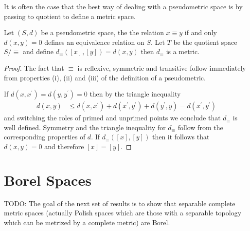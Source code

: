 It is often the case that the best way of dealing with a pseudometric space is by passing to quotient to define a metric space.
\begin{prop}\label{QuotientOfPseudometricSpace}Let $(S,d)$ be a pseudometric space, the the relation $x \equiv y$ if and only $d(x,y) = 0$ defines an equivalence
relation on $S$.  Let $T$ be the quotient space $S/\equiv$ and define $d_{\equiv}([x], [y]) = d(x,y)$ then $d_\equiv$ is a metric.
\end{prop}
\begin{proof}
The fact that $\equiv$ is reflexive, symmetric and transitive follow immediately from properties (i), (ii) and (iii) of the definition of a pseudometric.

If $d(x,x^\prime) = d(y,y^\prime) = 0$ then by the triangle inequality
\begin{align*}
d(x,y) &\leq d(x, x^\prime) + d(x^\prime, y^\prime) + d(y^\prime, y) = d(x^\prime, y^\prime)
\end{align*}
and switching the roles of primed and unprimed points we conclude that $d_\equiv$ is well defined.  Symmetry and the triangle inequality for $d_\equiv$ follow from
the corresponding properties of $d$.  If $d_\equiv([x], [y])$ then it follows that $d(x,y) = 0$ and therefore $[x]=[y]$.
\end{proof}

\section{Borel Spaces}

TODO: The goal of the next set of results is to show that separable
complete metric spaces (actually Polish spaces which are those with
a separable topology which can be metrized by a complete metric) are Borel.

